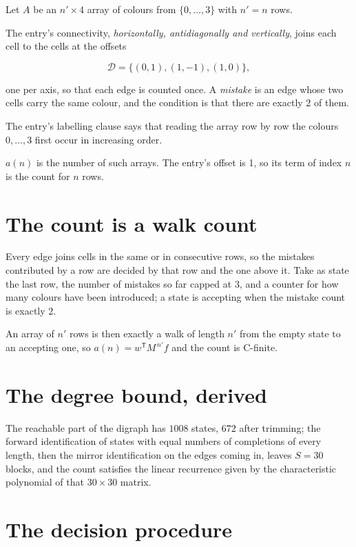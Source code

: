\documentclass[11pt]{article}
\theoremstyle{definition}
\begin{document}
Let $A$ be an $n' \times 4$ array of colours from $\{0,\dots,3\}$ with $n' = n$ rows.

The entry's connectivity, {\itshape horizontally, antidiagonally and vertically}, joins each cell to the cells at the offsets

\[\mathcal{D} = \{(0,1), (1,-1), (1,0)\},\]

one per axis, so that each edge is counted once. A {\itshape mistake} is an edge whose two cells carry the same colour, and the condition is that there are exactly $2$ of them.

The entry's labelling clause says that reading the array row by row the colours $0,\dots,3$ first occur in increasing order.

$a(n)$ is the number of such arrays. The entry's offset is 1, so its term of index $n$ is the count for $n$ rows.

\section{The count is a walk count}

Every edge joins cells in the same or in consecutive rows, so the mistakes contributed by a row are decided by that row and the one above it. Take as state the last row, the number of mistakes so far capped at $3$, and a counter for how many colours have been introduced; a state is accepting when the mistake count is exactly $2$.

An array of $n'$ rows is then exactly a walk of length $n'$ from the empty state to an accepting one, so $a(n) = w^{\mathsf T}M^{\,n'}f$ and the count is C-finite.

\section{The degree bound, derived}

The reachable part of the digraph has $1008$ states, $672$ after trimming; the forward identification of states with equal numbers of completions of every length, then the mirror identification on the edges coming in, leaves $S = 30$ blocks, and the count satisfies the linear recurrence given by the characteristic polynomial of that $30\times30$ matrix.

\section{The decision procedure}
\end{document}
